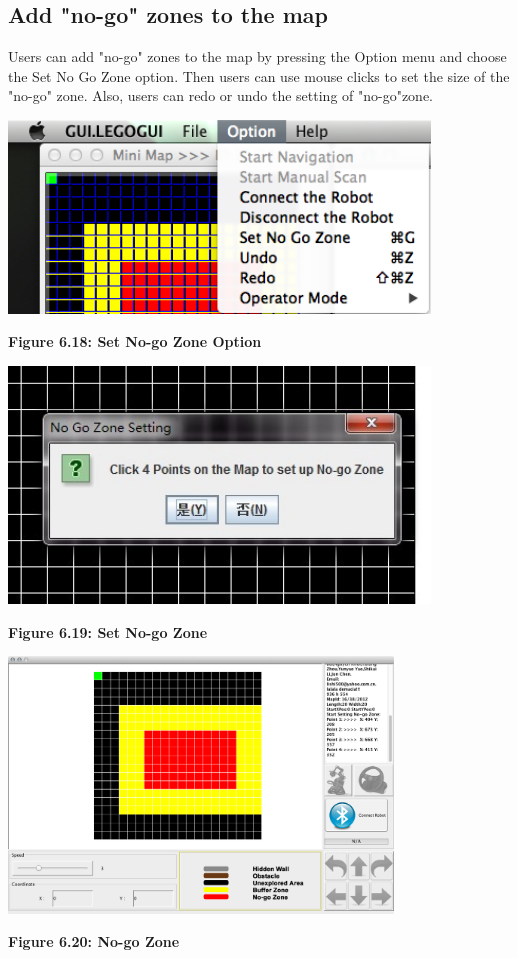 \documentclass[11pt, a4paper]{report}
\begin{document}
\subsection{Add "no-go" zones to the map}
Users can add "no-go" zones to the map by  pressing the Option menu and choose the Set No Go Zone option. Then users can use mouse clicks to set the size of the "no-go" zone. Also, users can redo or undo the setting of "no-go"zone.
  \begin{center}
 \includegraphics[width=11.20cm]{NoGoZoneOption.png}
\end{center}
\begin{center}
\textbf {Figure 6.18: Set No-go Zone Option} \\[0.3cm]
\end{center}
  \begin{center}
 \includegraphics[width=11.20cm]{setNoGoZone1.jpg}
\end{center}
\begin{center}
\textbf {Figure 6.19: Set No-go Zone} \\[0.3cm]
\end{center}
  \begin{center}
 \includegraphics[width=10.20cm]{NoGoZone.png}
\end{center}
\begin{center}
\textbf {Figure 6.20: No-go Zone} \\[0.3cm]
\end{center}
\end{document}
